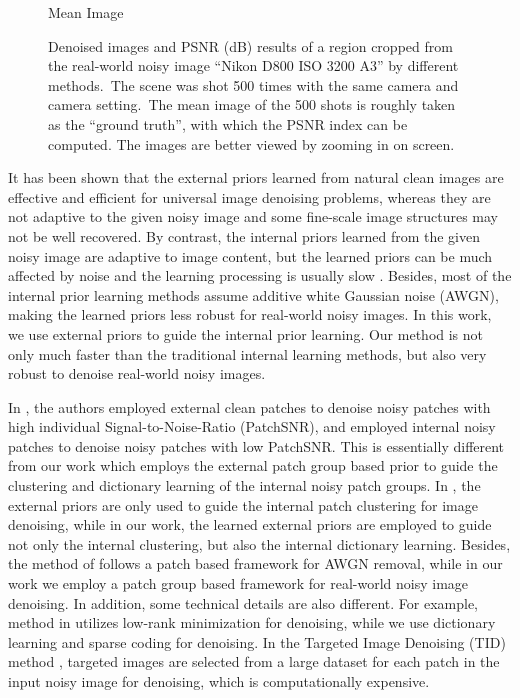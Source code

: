 \begin{figure}
{\begin{minipage}[t]{0.19\textwidth}
{\footnotesize Mean Image}
\end{minipage}
}\vspace{-3mm}
\caption{Denoised images and PSNR (dB) results of a region cropped from the real-world noisy image ``Nikon D800 ISO 3200 A3'' \cite{crosschannel2016} by different methods.\ The scene was shot 500 times with the same camera and camera setting.\ The mean image of the 500 shots is roughly taken as the ``ground truth'', with which the PSNR index can be computed. The images are better viewed by zooming in on screen.}
    \label{fig3-1}
\end{figure}

It has been shown \cite{foe,epll,pgpd} that the external priors learned from natural clean images are effective and efficient for universal image denoising problems, whereas they are not adaptive to the given noisy image and some fine-scale image structures may not be well recovered. By contrast, the internal priors learned from the given noisy image are adaptive to image content, but the learned priors can be much affected by noise and the learning processing is usually slow \cite{blsgsm,zhou2012nonparametric,ksvd,lssc,ncsr}. Besides, most of the internal prior learning methods \cite{blsgsm,zhou2012nonparametric,ksvd,lssc,ncsr} assume additive white Gaussian noise (AWGN), making the learned priors less robust for real-world noisy images. In this work, we use external priors to guide the internal prior learning. Our method is not only much faster than the traditional internal learning methods, but also very robust to denoise real-world noisy images.

In \cite{combexin}, the authors employed external clean patches to denoise noisy patches with high individual Signal-to-Noise-Ratio (PatchSNR), and employed internal noisy patches to denoise noisy patches with low PatchSNR. This is essentially different from our work which employs the external patch group based prior to guide the clustering and dictionary learning of the internal noisy patch groups. In \cite{external}, the external priors are only used to guide the internal patch clustering for image denoising, while in our work, the learned external priors are employed to guide not only the internal clustering, but also the internal dictionary learning. Besides, the method of \cite{external} follows a patch based framework for AWGN removal, while in our work we employ a patch group based framework for real-world noisy image denoising. In addition, some technical details are also different. For example, method in \cite{external} utilizes low-rank minimization for denoising, while we use dictionary learning and sparse coding for denoising. In the Targeted Image Denoising (TID) method \cite{tid}, targeted images are selected from a large dataset for each patch in the input noisy image for denoising, which is computationally expensive.


